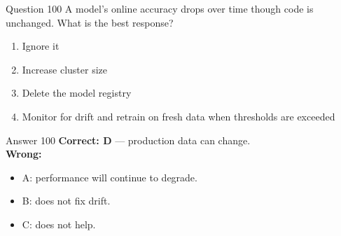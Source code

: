 \documentclass[aspectratio=169,11pt]{beamer}
\begin{document}
\begin{frame}{Question 100}
A model's online accuracy drops over time though code is unchanged. What is the best response?
\begin{enumerate}[label=\Alph*.]
\item Ignore it
\item Increase cluster size
\item Delete the model registry
\item Monitor for drift and retrain on fresh data when thresholds are exceeded
\end{enumerate}
\end{frame}
\begin{frame}{Answer 100}
\textbf{Correct: D} --- production data can change.\\
\vspace{0.5em}
\textbf{Wrong:}
\begin{itemize}
\item A: performance will continue to degrade.
\item B: does not fix drift.
\item C: does not help.
\end{itemize}
\end{frame}
\end{document}

